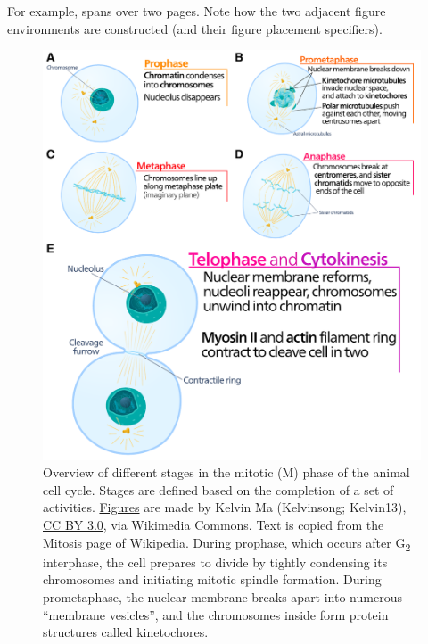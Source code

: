 For example,  spans over two pages.
Note how the two adjacent figure environments are constructed (and their figure placement specifiers).

\begin{figure}[p]
    \centering
    \includegraphics[width=\linewidth]{figures/cell-cycle-mitosis.pdf}
    \caption[Stages of mitotic phase of the cell cycle]{%
        Overview of different stages in the mitotic (M) phase of the animal cell cycle.
        Stages are defined based on the completion of a set of activities.
        \href{https://commons.wikimedia.org/wiki/File:Animal_cell_cycle-en.svg}{Figures} are made by Kelvin Ma (Kelvinsong; Kelvin13), \href{https://creativecommons.org/licenses/by/3.0}{CC BY 3.0}, via Wikimedia Commons.
        Text is copied from the \href{https://en.wikipedia.org/wiki/Mitosis}{Mitosis} page of Wikipedia.
        During prophase, which occurs after G\textsubscript{2} interphase,
        the cell prepares to divide by tightly condensing its chromosomes and initiating mitotic spindle formation.
        During prometaphase, the nuclear membrane breaks apart into numerous ``membrane vesicles'', and the chromosomes inside form protein structures called kinetochores.
        \legendcontdnote
    }
    \label{fig:cell-cycle-mitosis}
\end{figure}

